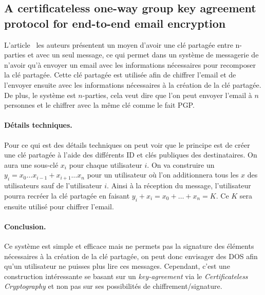 \subsection{A certificateless one-way group key agreement protocol for end-to-end email encryption}
L'article~\cite{conf/prdc/YehSDSSW18} les auteurs présentent un moyen d'avoir une clé partagée entre n-parties et avec un seul message, ce qui permet dans un système de messagerie de n'avoir qu'à envoyer un email avec les informations nécessaires pour recomposer la clé partagée. Cette clé partagée est utilisée afin de chiffrer l'email et de l'envoyer ensuite avec les informations nécessaires à la création de la clé partagée. De plus, le système est $n$-parties, cela veut dire que l'on peut envoyer l'email à $n$ personnes et le chiffrer avec la même clé comme le fait PGP.

\paragraph*{Détails techniques.} Pour ce qui est des détails techniques on peut voir que le principe est de créer une clé partagée à l'aide des différents ID et clés publiques des destinataires. On aura une sous-clé $x_i$ pour chaque utilisateur $i$. On va construire un $y_i = x_0 \dots x_{i-1} + x_{i+1} \dots x_n$ pour un utilisateur où l'on additionnera tous les $x$ des utilisateurs sauf de l'utilisateur $i$. Ainsi à la réception du message, l'utilisateur pourra recréer la clé partagée en faisant $y_i + x_i = x_0 + \dots + x_n = K$. Ce $K$ sera ensuite utilisé pour chiffrer l'email.

\paragraph*{Conclusion.} Ce système est simple et efficace mais ne permets pas la signature des éléments nécessaires à la création de la clé partagée, on peut donc envisager des DOS afin qu'un utilisateur ne puisses plus lire ces messages. Cependant, c'est une construction intéressante se basant sur un \textit{key-agreement} via le \textit{Certificateless Cryptography} et non pas sur ses possibilités de chiffrement/signature.



